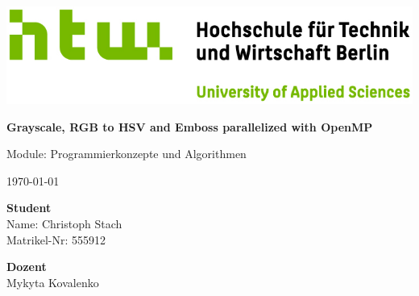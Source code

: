 


    \begin{titlepage}
        \noindent
        \includegraphics[width=1.0\textwidth]{images/Q04_HTW_Berlin_Logo_quer_pos_FARBIG_RGB.jpg}


        \vspace{2cm}

        \begin{center}
            \noindent
            \huge{\textbf{Grayscale, RGB to HSV and Emboss parallelized with OpenMP}}

            \vspace{1cm}

            \noindent
            \LARGE{Module: Programmierkonzepte und Algorithmen}

            \vspace{1cm}

            \noindent
            \small{\today}
        \end{center}

        \vfill

        \noindent
        \begin{minipage}[t]{0.5\textwidth}
            \begin{flushleft}
                \textbf{Student}\\
                Name: Christoph Stach\\
                Matrikel-Nr: 555912                
            \end{flushleft}
        \end{minipage}
        \begin{minipage}[t]{0.5\textwidth}
            \begin{flushright}
                \textbf{Dozent}\\
                Mykyta Kovalenko\\
            \end{flushright}
        \end{minipage}
    \end{titlepage}

    \tableofcontents

    
    
    
          

